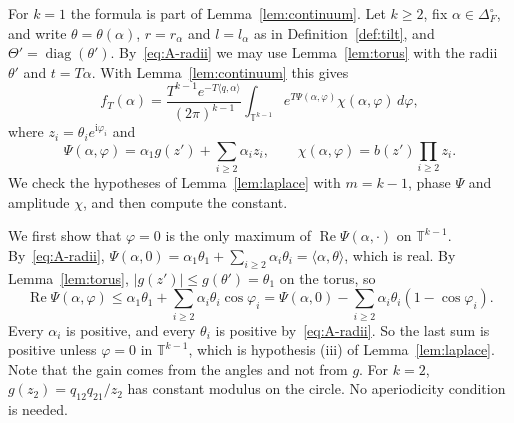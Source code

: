 For $k=1$ the formula is part of Lemma~\ref{lem:continuum}. Let $k\ge2$, fix
$\alpha\in\Delta_F^\circ$, and write $\theta=\theta(\alpha)$, $r=r_\alpha$
and $l=l_\alpha$ as in Definition~\ref{def:tilt}, and
$\Theta'=\operatorname{diag}(\theta')$. By~\eqref{eq:A-radii} we may use
Lemma~\ref{lem:torus} with the radii $\theta'$ and $t=T\alpha$. With
Lemma~\ref{lem:continuum} this gives
\begin{equation}\label{eq:A-fT}
f_T(\alpha)=\frac{T^{k-1}e^{-T\langle q,\alpha\rangle}}{(2\pi)^{k-1}}
\int_{\mathbb T^{k-1}}e^{T\Psi(\alpha,\varphi)}\chi(\alpha,\varphi)\,d\varphi,
\end{equation}
where $z_i=\theta_ie^{\mathrm i\varphi_i}$ and
\[
\Psi(\alpha,\varphi)=\alpha_1g(z')+\sum_{i\ge2}\alpha_iz_i,\qquad
\chi(\alpha,\varphi)=b(z')\prod_{i\ge2}z_i .
\]
We check the hypotheses of Lemma~\ref{lem:laplace} with $m=k-1$, phase $\Psi$
and amplitude $\chi$, and then compute the constant.

We first show that $\varphi=0$ is the only maximum of
$\operatorname{Re}\Psi(\alpha,\cdot)$ on $\mathbb T^{k-1}$.
By~\eqref{eq:A-radii}, $\Psi(\alpha,0)=\alpha_1\theta_1+\sum_{i\ge2}\alpha_i\theta_i
=\langle\alpha,\theta\rangle$, which is real. By Lemma~\ref{lem:torus},
$\lvert g(z')\rvert\le g(\theta')=\theta_1$ on the torus, so
\[
\operatorname{Re}\Psi(\alpha,\varphi)\le\alpha_1\theta_1+\sum_{i\ge2}\alpha_i\theta_i\cos\varphi_i
=\Psi(\alpha,0)-\sum_{i\ge2}\alpha_i\theta_i(1-\cos\varphi_i).
\]
Every $\alpha_i$ is positive, and every $\theta_i$ is positive
by~\eqref{eq:A-radii}. So the last sum is positive unless $\varphi=0$ in
$\mathbb T^{k-1}$, which is hypothesis (iii) of Lemma~\ref{lem:laplace}. Note
that the gain comes from the angles and not from $g$. For $k=2$,
$g(z_2)=q_{12}q_{21}/z_2$ has constant modulus on the circle. No
aperiodicity condition is needed.

